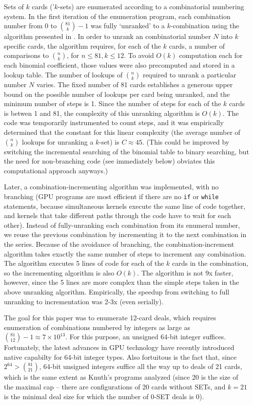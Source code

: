 \documentclass[10pt]{amsart}
\begin{document}
Sets of $k$ cards ('$k$-sets) are enumerated according to a combinatorial
numbering system. In the first iteration of the enumeration program, each
combination number from 0 to $\binom{81}{k}-1$ was fully `unranked' to a
$k$-combination using the algorithm presented in \cite{WIKI}. In order to unrank
an combinatorial number $N$ into $k$ specific cards, the algorithm requires, for
each of the $k$ cards, a number of comparisons to $\binom{n}{k}$, for $n\le 81,
k\le 12$. To avoid $O(k)$ computation each for each binomial coefficient, those
values were also precomputed and stored in a lookup table. The number of lookups
of $\binom{n}{k}$ required to unrank a particular number $N$ varies. The fixed
number of 81 cards establishes a generous upper bound on the possible number of
lookups per card being unranked, and the minimum number of steps is 1. Since the
number of steps for each of the $k$ cards is betwen 1 and 81, the complexity of
this unranking algorithm is $O(k)$. The code was temporarily instrumented to
count steps, and it was empirically determined that the constant for this linear
complexity (the average number of $\binom{n}{k}$ lookups for unranking a
$k$-set) is $C\approx 45$. (This could be improved by switching the incremental
searching of the binomial table to binary searching, but the need for
non-branching code (see immediately below) obviates this computational approach
anyways.)

Later, a combination-incrementing algorithm was implemented, with no branching
(GPU programs are most efficient if there are no {\tt if} or {\tt while}
statements, because simultaneous kernels execute the same line of code together,
and kernels that take different paths through the code have to wait for each
other). Instead of fully-unranking each combination from its enumeral number, we
reuse the previous combination by incrementing it to the next combination in the
series. Because of the avoidance of branching, the combination-increment
algorithm takes exactly the same number of steps to increment any
combination. The algorithm executes 5 lines of code for each of the $k$ cards in
the combination, so the incrementing algorithm is also $O(k)$. The algorithm is
not 9x faster, however, since the 5 lines are more complex than the simple steps
taken in the above unranking algorithm. Empirically, the speedup from switching
to full unranking to incrementation was 2-3x (even serially).

The goal for this paper was to enumerate 12-card deals, which requires
enumeration of combinations numbered by integers as large as $\binom{81}{12}-1
\approx 7\times 10^{13}$. For this purpose, an unsigned 64-bit integer
suffices. Fortunately, the latest advances in GPU technology have recently
introduced native capabilty for 64-bit integer types. Also fortuitous is the
fact that, since $2^{64} > \binom{81}{21}$, 64-bit unsigned integers suffice all
the way up to deals of 21 cards, which is the same extent as Knuth's programs
analyzed (since 20 is the size of the maximal cap -- there are configurations of
20 cards without SETs, and $k=21$ is the minimal deal size for which the number
of 0-SET deals is 0).
\end{document}
